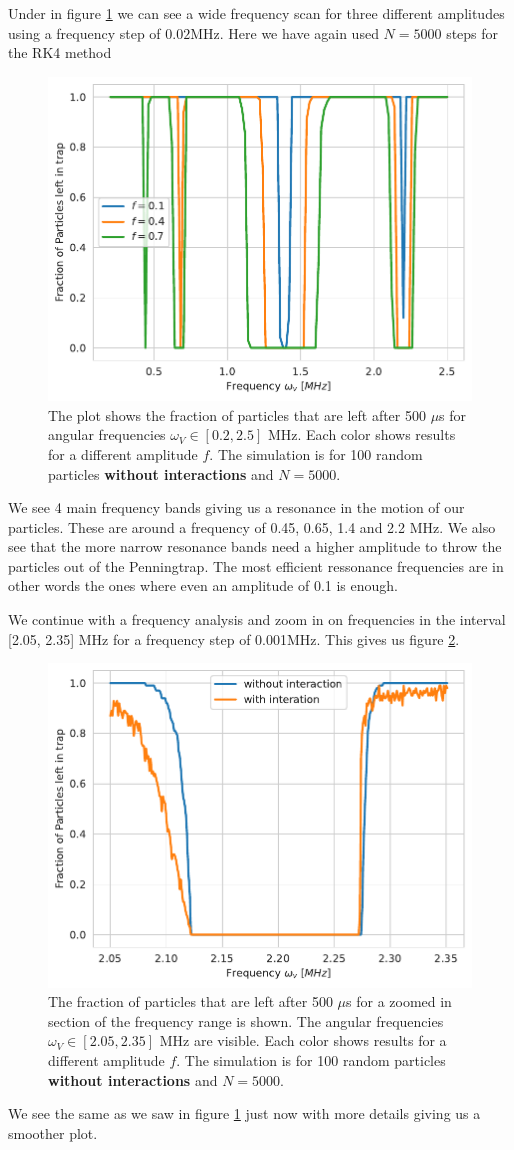 \documentclass[english,notitlepage,reprint,nofootinbib]{revtex4-1}  %
\begin{document}
Under in figure \ref{fig:wide_freq_p_left_N_5000} we can see a wide frequency scan for three different amplitudes using a frequency step of $0.02$MHz.
Here we have again used $N=5000$ steps for the RK4 method
\begin{figure}[H]
    \centering
    \includegraphics[width=.5\textwidth]{../figures/wide_freq_p_left_N_5000.pdf}
    \caption{The plot shows the fraction of particles that are left after 500 $\mu$s for angular frequencies $\omega_V \in [0.2,2.5]$ MHz. Each color
        shows results for a different amplitude $f$. The simulation is for 100 random particles \textbf{without interactions}
        and $N = 5000$.}
    \label{fig:wide_freq_p_left_N_5000}
\end{figure}
We see 4 main frequency bands giving us a resonance in the motion of our particles. These are around a frequency of 0.45, 0.65, 1.4 and 2.2 MHz. We also see that the more narrow resonance bands need a higher amplitude to throw the particles out of the Penningtrap. The most efficient ressonance frequencies are in other words the ones where even an amplitude of 0.1 is enough.

We continue with a frequency analysis and zoom in on frequencies in the interval [2.05, 2.35] MHz for a frequency step of 0.001MHz. This gives us figure \ref{fig:narrow_freq_p_left_N_5000_zoom}.
\begin{figure}[H]
    \centering
    \includegraphics[width=.5\textwidth]{../figures/narrow_freq_p_left_N_5000_zoom.pdf}
    \caption{The fraction of particles that are left after 500 $\mu$s for a zoomed in section of the frequency range
        is shown. The angular frequencies $\omega_V \in [2.05,2.35]$ MHz are visible. Each color shows results for a
        different amplitude $f$. The simulation is for 100 random particles \textbf{without interactions} and $N = 5000$.}
    \label{fig:narrow_freq_p_left_N_5000_zoom}
\end{figure}
We see the same as we saw in figure \ref{fig:wide_freq_p_left_N_5000} just now with more details giving us a smoother plot.
\end{document}
